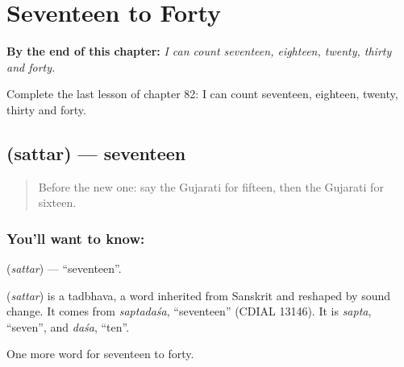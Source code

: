 
\chapter{Seventeen to Forty}
\label{ch:gu-seventeen-to-forty}

\begin{chapteropening}
\textbf{By the end of this chapter:} \emph{I can count seventeen, eighteen, twenty, thirty and forty.}

Complete the last lesson of chapter 82: I can count seventeen, eighteen, twenty, thirty and forty.
\end{chapteropening}

\section[\texorpdfstring{\gu{સત્તર} (sattar)}{સત્તર (sattar)}]{ (sattar) — seventeen}

\label{lesson:GU-C82-seventeen}



\begin{quote}
Before the new one: say the Gujarati for fifteen, then the Gujarati for sixteen.
\end{quote}

\subsection*{You'll want to know: }
\textbf{} (\emph{sattar}) — \textquotedblleft{}seventeen\textquotedblright{}.

\begin{cousinweb}
\textbf{} (\emph{sattar}) is a tadbhava, a word inherited from Sanskrit and reshaped by sound change. It comes from \emph{saptadaśa}, \textquotedblleft{}seventeen\textquotedblright{} (CDIAL 13146). It is \emph{sapta}, \textquotedblleft{}seven\textquotedblright{}, and \emph{daśa}, \textquotedblleft{}ten\textquotedblright{}.
\end{cousinweb}

\begin{grammarlens}[title={What you've built}]
One more word for seventeen to forty.
\end{grammarlens}

